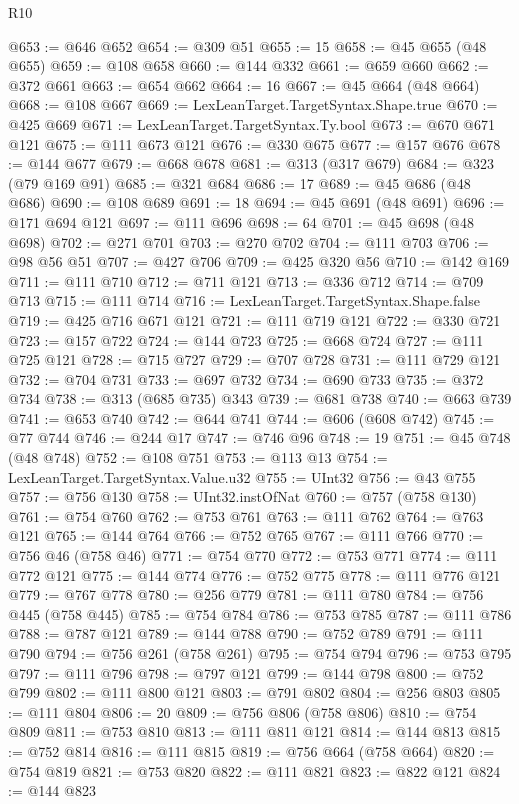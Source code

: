\begin{lexlean}{R10}
\begin{coremodule}
@653 := @646 @652
@654 := @309 @51
@655 := 15
@658 := @45 @655 (@48 @655)
@659 := @108 @658
@660 := @144 @332
@661 := @659 @660
@662 := @372 @661
@663 := @654 @662
@664 := 16
@667 := @45 @664 (@48 @664)
@668 := @108 @667
@669 := LexLeanTarget.TargetSyntax.Shape.true
@670 := @425 @669
@671 := LexLeanTarget.TargetSyntax.Ty.bool
@673 := @670 @671 @121
@675 := @111 @673 @121
@676 := @330 @675
@677 := @157 @676
@678 := @144 @677
@679 := @668 @678
@681 := @313 (@317 @679)
@684 := @323 (@79 @169 @91)
@685 := @321 @684
@686 := 17
@689 := @45 @686 (@48 @686)
@690 := @108 @689
@691 := 18
@694 := @45 @691 (@48 @691)
@696 := @171 @694 @121
@697 := @111 @696
@698 := 64
@701 := @45 @698 (@48 @698)
@702 := @271 @701
@703 := @270 @702
@704 := @111 @703
@706 := @98 @56 @51
@707 := @427 @706
@709 := @425 @320 @56
@710 := @142 @169
@711 := @111 @710
@712 := @711 @121
@713 := @336 @712
@714 := @709 @713
@715 := @111 @714
@716 := LexLeanTarget.TargetSyntax.Shape.false
@719 := @425 @716 @671 @121
@721 := @111 @719 @121
@722 := @330 @721
@723 := @157 @722
@724 := @144 @723
@725 := @668 @724
@727 := @111 @725 @121
@728 := @715 @727
@729 := @707 @728
@731 := @111 @729 @121
@732 := @704 @731
@733 := @697 @732
@734 := @690 @733
@735 := @372 @734
@738 := @313 (@685 @735) @343
@739 := @681 @738
@740 := @663 @739
@741 := @653 @740
@742 := @644 @741
@744 := @606 (@608 @742)
@745 := @77 @744
@746 := @244 @17
@747 := @746 @96
@748 := 19
@751 := @45 @748 (@48 @748)
@752 := @108 @751
@753 := @113 @13
@754 := LexLeanTarget.TargetSyntax.Value.u32
@755 := UInt32
@756 := @43 @755
@757 := @756 @130
@758 := UInt32.instOfNat
@760 := @757 (@758 @130)
@761 := @754 @760
@762 := @753 @761
@763 := @111 @762
@764 := @763 @121
@765 := @144 @764
@766 := @752 @765
@767 := @111 @766
@770 := @756 @46 (@758 @46)
@771 := @754 @770
@772 := @753 @771
@774 := @111 @772 @121
@775 := @144 @774
@776 := @752 @775
@778 := @111 @776 @121
@779 := @767 @778
@780 := @256 @779
@781 := @111 @780
@784 := @756 @445 (@758 @445)
@785 := @754 @784
@786 := @753 @785
@787 := @111 @786
@788 := @787 @121
@789 := @144 @788
@790 := @752 @789
@791 := @111 @790
@794 := @756 @261 (@758 @261)
@795 := @754 @794
@796 := @753 @795
@797 := @111 @796
@798 := @797 @121
@799 := @144 @798
@800 := @752 @799
@802 := @111 @800 @121
@803 := @791 @802
@804 := @256 @803
@805 := @111 @804
@806 := 20
@809 := @756 @806 (@758 @806)
@810 := @754 @809
@811 := @753 @810
@813 := @111 @811 @121
@814 := @144 @813
@815 := @752 @814
@816 := @111 @815
@819 := @756 @664 (@758 @664)
@820 := @754 @819
@821 := @753 @820
@822 := @111 @821
@823 := @822 @121
@824 := @144 @823

\end{coremodule}
\end{lexlean}
